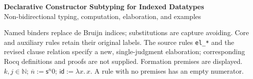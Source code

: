 \documentclass[10pt,a4paper]{article}
\newcommand{\op}[1]{\mathsf{#1}}
\newcommand{\id}{\op{id}}
\newcommand{\pos}[1]{\overline{#1}}
\begin{document}
\begin{center}
{\Large\bfseries Declarative Constructor Subtyping for Indexed Datatypes}\\[3pt]
Non-bidirectional typing, computation, elaboration, and examples
\end{center}
Named binders replace de Bruijn indices; substitutions are capture avoiding.
Core and auxiliary rules retain their original labels. The source rules
\texttt{el\_*} and the revised clause relation specify a new, single-judgment
elaboration; corresponding Rocq definitions and proofs are not supplied.
Formation premises are displayed. $k,j\in\mathbb N$;
$\pos{n}:=\op{s}^{n}0$; $\id:=\lambda x.\,x$.
A rule with no premises has an empty numerator.





\end{document}
